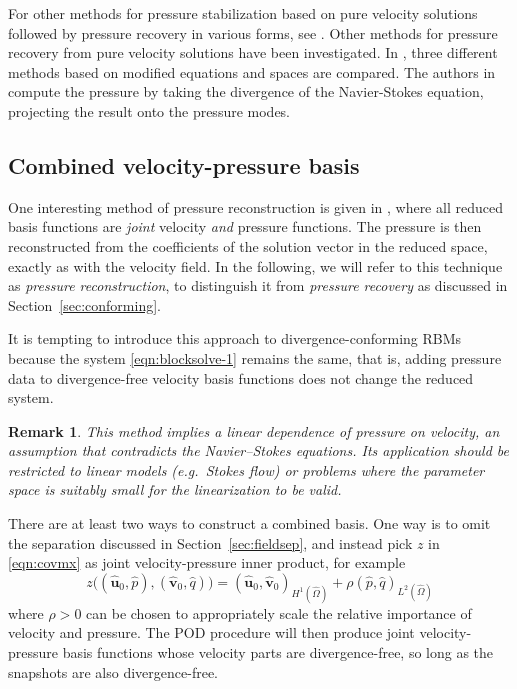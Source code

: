 \documentclass[onecolumn, twoside, a4paper, 11pt]{article}
\newtheorem{remark}{Remark}
\begin{document}
For other methods for pressure stabilization based on pure velocity solutions followed by pressure
recovery in various forms, see \cite{Akhtar2009ser,Caiazzo2014niv,Baiges2013ero}. Other methods for
pressure recovery from pure velocity solutions have been investigated. In \cite{Caiazzo2014niv},
three different methods based on modified equations and spaces are compared. The authors in
\cite{Akhtar2009ser} compute the pressure by taking the divergence of the Navier-Stokes equation,
projecting the result onto the pressure modes.

\subsection{Combined velocity-pressure basis}
\label{sec:combined}

One interesting method of pressure reconstruction is given in \cite{Baiges2013ero}, where all
reduced basis functions are \emph{joint} velocity \emph{and} pressure functions. The pressure is
then reconstructed from the coefficients of the solution vector in the reduced space, exactly as
with the velocity field. In the following, we will refer to this technique as
\emph{pressure reconstruction}, to distinguish it from \emph{pressure recovery} as discussed in
Section~\ref{sec:conforming}.

It is tempting to introduce this approach to divergence-conforming RBMs because the system
\eqref{eqn:blocksolve-1} remains the same, that is, adding pressure data to divergence-free velocity
basis functions does not change the reduced system.

\begin{remark}
  \label{rem:linearity}
  This method implies a linear dependence of pressure on velocity, an assumption that contradicts
  the Navier--Stokes equations. Its application should be restricted to linear models (e.g.~Stokes
  flow) or problems where the parameter space is suitably small for the linearization to be valid.
\end{remark}

There are at least two ways to construct a combined basis. One way is to omit the separation
discussed in Section~\ref{sec:fieldsep}, and instead pick $z$ in \eqref{eqn:covmx} as joint
velocity-pressure inner product, for example
\begin{equation}
  \label{eqn:z_c}
  z\big((\hat{\bm u}_0, \hat{p}), (\hat{\bm v}_0, \hat{q})\big) =
  \left( \hat{\bm u}_0, \hat{\bm v}_0 \right)_{H^1(\hat{\Omega})}
  + \rho \left( \hat{p}, \hat{q} \right)_{L^2(\hat{\Omega})}
\end{equation}
where $\rho > 0$ can be chosen to appropriately scale the relative importance of velocity
and pressure. The POD procedure will then produce joint velocity-pressure basis functions whose
velocity parts are divergence-free, so long as the snapshots are also divergence-free.
\end{document}

